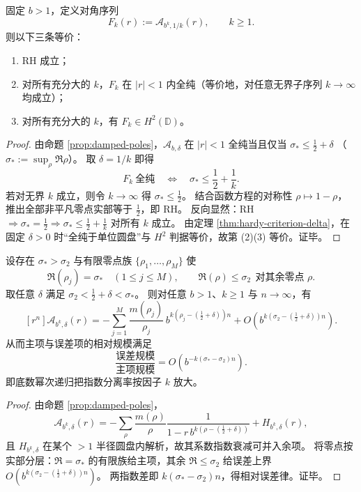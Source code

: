 \begin{theorem}\label{thm:abel-diagonal-renormalization-rh-criterion}
固定 \(b>1\)，定义对角序列
\[
F_k(r):=\mathcal A_{b^k,1/k}(r),\qquad k\ge 1.
\]
则以下三条等价：
\begin{enumerate}
  \item RH 成立；
  \item 对所有充分大的 \(k\)，\(F_k\) 在 \(|r|<1\) 内全纯（等价地，对任意无界子序列 \(k\to\infty\) 均成立）；
  \item 对所有充分大的 \(k\)，有 \(F_k\in H^2(\mathbb D)\)。
\end{enumerate}
\end{theorem}
\begin{proof}
由命题 \ref{prop:damped-poles}，\(\mathcal A_{b,\delta}\) 在 \(|r|<1\) 全纯当且仅当
\(
\sigma_*\le \frac12+\delta
\)
（\(\sigma_*:=\sup_\rho\Re\rho\)）。
取 \(\delta=1/k\) 即得
\[
F_k\ \text{全纯}\quad\Longleftrightarrow\quad \sigma_*\le \frac12+\frac1k.
\]
若对无界 \(k\) 成立，则令 \(k\to\infty\) 得 \(\sigma_*\le\frac12\)。
结合函数方程的对称性 \(\rho\mapsto 1-\rho\)，推出全部非平凡零点实部等于 \(\frac12\)，即 RH。
反向显然：RH \(\Rightarrow \sigma_*=\frac12\Rightarrow \sigma_*\le \frac12+\frac1k\) 对所有 \(k\) 成立。
由定理 \ref{thm:hardy-criterion-delta}，在固定 \(\delta>0\) 时“全纯于单位圆盘”与 \(H^2\) 判据等价，故第 (2)(3) 等价。证毕。
\end{proof}

\begin{theorem}[幂底数递归下的谱隙放大与误差指数分离]\label{thm:abel-power-base-gap-amplification}
设存在 \(\sigma_*>\sigma_2\) 与有限零点族 \(\{\rho_1,\dots,\rho_M\}\) 使
\[
\Re(\rho_j)=\sigma_*\quad(1\le j\le M),\qquad
\Re(\rho)\le \sigma_2\ \ \text{对其余零点 }\rho.
\]
取任意 \(\delta\) 满足
\(
\sigma_2<\frac12+\delta<\sigma_*
\)。
则对任意 \(b>1\)、\(k\ge 1\) 与 \(n\to\infty\)，有
\[
[r^n]\mathcal A_{b^k,\delta}(r)
=-\sum_{j=1}^M\frac{m(\rho_j)}{\rho_j}\,b^{k(\rho_j-(\frac12+\delta))n}
+O\!\left(b^{k(\sigma_2-(\frac12+\delta))n}\right).
\]
从而主项与误差项的相对规模满足
\[
\frac{\text{误差规模}}{\text{主项规模}}
=O\!\left(b^{-k(\sigma_*-\sigma_2)n}\right).
\]
即底数幂次递归把指数分离率按因子 \(k\) 放大。
\end{theorem}
\begin{proof}
由命题 \ref{prop:damped-poles}，
\[
\mathcal A_{b^k,\delta}(r)
=-\sum_\rho\frac{m(\rho)}{\rho}\frac1{1-r\,b^{k(\rho-(\frac12+\delta))}}
+H_{b^k,\delta}(r),
\]
且 \(H_{b^k,\delta}\) 在某个 \(>1\) 半径圆盘内解析，故其系数指数衰减可并入余项。
将零点按实部分层：\(\Re=\sigma_*\) 的有限族给主项，其余 \(\Re\le \sigma_2\) 给误差上界
\(
O(b^{k(\sigma_2-(\frac12+\delta))n})
\)。
两指数差即
\(
k(\sigma_*-\sigma_2)n
\)，得相对误差律。证毕。
\end{proof}



\endinput

